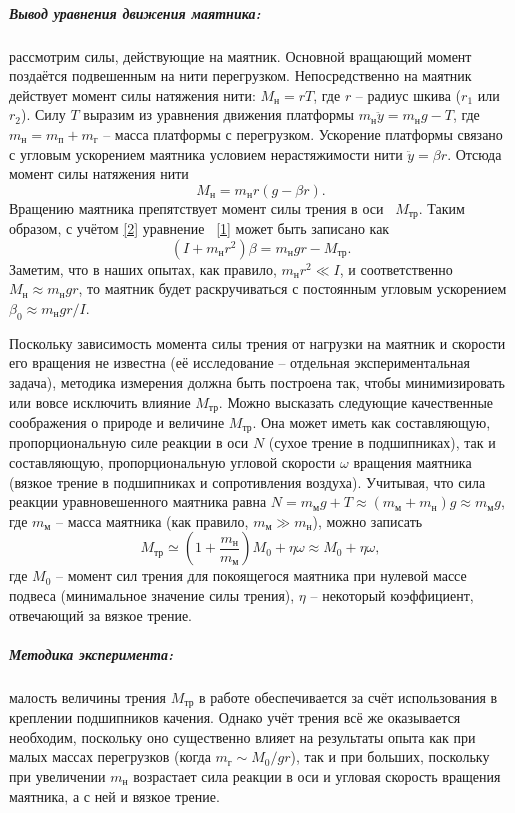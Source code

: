 \documentclass[a4paper,12pt]{article}
\begin{document}
\subparagraph*{Вывод уравнения движения маятника: } рассмотрим силы, действующие на маятник. Основной вращающий момент поздаётся подвешенным на нити перегрузком. Непосредственно на маятник действует момент силы натяжения нити: $M_н = rT$, где $r$ -- радиус шкива ($r_1$ или $r_2$). Силу $T$ выразим из уравнения движения платформы $m_н\ddot{y}= m_нg - T$, где $m_н = m_п + m_г$ -- масса платформы с перегрузком. Ускорение платформы связано с угловым ускорением маятника условием нерастяжимости нити $\ddot{y}=\beta r$. Отсюда момент силы натяжения нити 
\begin{equation}\label{2}
M_н = m_нr(g - \beta r).
\end{equation}
Вращению маятника препятствует момент силы трения в оси  $M_{тр}$. Таким образом, с учётом \eqref{2} уравнение  \eqref{1} может быть записано как
\begin{equation}\label{3}
(I + m_нr^2)\beta = m_нgr - {M_{тр}}.
\end{equation}
Заметим, что в наших опытах, как правило, $m_нr^2 \ll I$, и соответственно $M_н \approx m_нgr$, то маятник будет раскручиваться с постоянным угловым ускорением $\beta _0 \approx m_нgr / I$.

Поскольку зависимость момента силы трения от нагрузки на маятник и скорости его вращения не известна (её исследование -- отдельная экспериментальная задача), методика измерения должна быть построена так, чтобы минимизировать или вовсе исключить влияние $M_{тр}$. Можно высказать следующие качественные соображения о природе и величине $M_{тр}$. Она может иметь как составляющую, пропорциональную силе реакции в оси $N$ (сухое трение в подшипниках),  так и составляющую, пропорциональную угловой скорости $\omega$ вращения маятника (вязкое трение в подшипниках и сопротивления воздуха). Учитывая, что сила реакции уравновешенного маятника равна $N = m_мg + T \approx (m_м + m_н)g \approx m_мg $, где $m_м$ -- масса маятника (как правило, $m_м \gg m_н$), можно записать
\begin{equation}\label{4}
M_{тр} \simeq \left(1 + \frac{m_н}{m_м}\right)M_0 + \eta\omega \approx M_0 + \eta\omega,
\end{equation}
где $M_0$ -- момент сил трения для покоящегося маятника при нулевой массе подвеса (минимальное значение силы трения), $\eta$ -- некоторый коэффициент, отвечающий за вязкое трение.
\subparagraph*{Методика эксперимента:}малость величины трения $M_{\text{тр}}$ в работе обеспечивается за счёт использования в креплении подшипников качения. Однако учёт трения всё же оказывается необходим, поскольку оно существенно влияет на результаты опыта как при малых массах перегрузков (когда $m_{г} \sim M_0 / gr$), так и при больших, поскольку при увеличении $m_{н}$ возрастает сила реакции в оси и угловая скорость вращения маятника, а с ней и вязкое трение.
\end{document}

